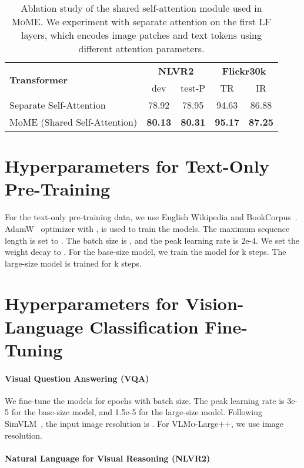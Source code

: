 \documentclass{article}
\newcommand\our{\textsc{VLMo}}
\newcommand\mome{\textsc{MoME}}
\begin{document}
\begin{table*}[ht]
\centering
\small
\begin{tabular}{lcccc}
\toprule
\multirow{2}{*}{\bf Transformer} &  \multicolumn{2}{c}{\bf NLVR2} & \multicolumn{2}{c}{\bf Flickr30k} \\
 & dev & test-P & TR & IR \\
\midrule
Separate Self-Attention & 78.92 & 78.95 & 94.63 & 86.88 \\
MoME (Shared Self-Attention) & \bf 80.13 & \bf 80.31 & \bf 95.17 & \bf 87.25 \\
\bottomrule
\end{tabular}
\caption{
Ablation study of the shared self-attention module used in \mome{}. We experiment with separate attention on the first LF layers, which encodes image patches and text tokens using different attention parameters. 
}
\label{tbl:ablation:shared_attention}
\end{table*}


\section{Hyperparameters for Text-Only Pre-Training}
\label{app:text_pretraining}

For the text-only pre-training data, we use English Wikipedia and BookCorpus~\cite{bookcorpus}.
AdamW~\cite{adamw} optimizer with ,  is used to train the models. 
The maximum sequence length is set to .
The batch size is , and the peak learning rate is 2e-4.
We set the weight decay to .
For the base-size model, we train the model for
k steps.
The large-size model is trained for k steps.



\section{Hyperparameters for Vision-Language Classification Fine-Tuning}
\label{app:finetune:cls}

\paragraph{Visual Question Answering (VQA)}
We fine-tune the models for  epochs with  batch size.
The peak learning rate is 3e-5 for the base-size model, and 1.5e-5 for the large-size model.
Following SimVLM~\cite{simvlm}, the input image resolution is . 
For \our{}-Large++, we use  image resolution.

\paragraph{Natural Language for Visual Reasoning (NLVR2)}
\end{document}
